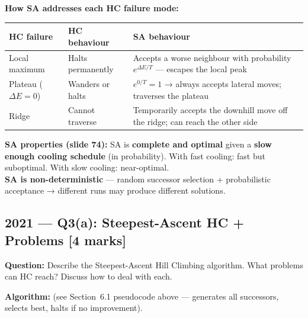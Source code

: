 \documentclass[12pt, a4paper]{article}
\newenvironment{solutionbox}{\begin{mdframed}[style=solutionframe]}{\end{mdframed}}
\newenvironment{answerbox}{\begin{mdframed}[style=answerframe]}{\end{mdframed}}
\begin{document}
\vspace{0.4em}

\noindent\textbf{How SA addresses each HC failure mode:}
\begin{center}
\renewcommand{\arraystretch}{1.4}
\small
\begin{tabular}{l|p{5cm}|p{7cm}}
\toprule
\textbf{HC failure} & \textbf{HC behaviour} & \textbf{SA behaviour} \\
\midrule
Local maximum & Halts permanently & Accepts a worse neighbour with probability $e^{\Delta E/T}$ — escapes the local peak \\
Plateau ($\Delta E{=}0$) & Wanders or halts & $e^{0/T} = 1$ → always accepts lateral moves; traverses the plateau \\
Ridge & Cannot traverse & Temporarily accepts the downhill move off the ridge; can reach the other side \\
\bottomrule
\end{tabular}
\end{center}

\begin{answerbox}
\textbf{SA properties (slide 74):} SA is \textbf{complete and optimal} given a \textbf{slow enough cooling schedule} (in probability). With fast cooling: fast but suboptimal. With slow cooling: near-optimal.\\
\textbf{SA is non-deterministic} — random successor selection + probabilistic acceptance → different runs may produce different solutions.
\end{answerbox}

\subsection{2021 — Q3(a): Steepest-Ascent HC + Problems [4 marks]}

\begin{solutionbox}
\textbf{Question:} Describe the Steepest-Ascent Hill Climbing algorithm. What problems can HC reach? Discuss how to deal with each.
\end{solutionbox}

\noindent\textbf{Algorithm:} (see Section~6.1 pseudocode above — generates all successors, selects best, halts if no improvement).
\end{document}
